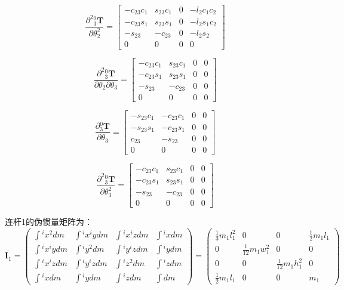 \documentclass{homework}
\begin{document}
\begin{sol}
\[
  \frac{\partial^2 {_3^0}\mathbf{T}}{\partial \theta_2^2} =
  \begin{bmatrix} 
    -c_{23} c_{1} & s_{23} c_{1} & 0 & - l_{2} c_{1} c_{2} \\ 
    -c_{23} s_{1} & s_{23} s_{1} & 0 & - l_{2} s_{1} c_{2} \\ 
    -s_{23} & -c_{23} & 0 & -l_{2} s_{2} \\ 
    0 & 0 & 0 & 0
  \end{bmatrix}
\]

\[
  \frac{\partial^2 {_3^0}\mathbf{T}}{\partial \theta_2 \partial \theta_3} =
  \begin{bmatrix} 
    -c_{23} c_{1} & s_{23} c_{1} & 0 & 0 \\ 
    -c_{23} s_{1} & s_{23} s_{1} & 0 & 0 \\ 
    -s_{23} & -c_{23} & 0 & 0 \\ 
    0 & 0 & 0 & 0
  \end{bmatrix}
\]

\[
  \frac{\partial {_3^0}\mathbf{T}}{\partial \theta_3} =
  \begin{bmatrix} 
    -s_{23} c_{1} & -c_{23} c_{1} & 0 & 0 \\ 
    -s_{23} s_{1} & -c_{23} s_{1} & 0 & 0 \\ 
    c_{23} & -s_{23} & 0 & 0 \\ 
    0 & 0 & 0 & 0
  \end{bmatrix}
\]

\[
  \frac{\partial^2 {_3^0}\mathbf{T}}{\partial \theta_3^2} =
  \begin{bmatrix} 
    -c_{23} c_{1} & s_{23} c_{1} & 0 & 0 \\ 
    -c_{23} s_{1} & s_{23} s_{1} & 0 & 0 \\ 
    -s_{23} & -c_{23} & 0 & 0 \\ 
    0 & 0 & 0 & 0
  \end{bmatrix}
\]

连杆1的伪惯量矩阵为：
\[
  \overline{\mathbf{I}_1} = 
  \begin{pmatrix}
    \int {^i}x^2 dm & \int {^i}x {^i}y dm & \int {^i}x {^i}z dm & \int {^i}x dm \\
    \int {^i}x {^i}y dm & \int {^i}y^2 dm & \int {^i}y {^i}z dm & \int {^i}y dm \\
    \int {^i}x {^i}z dm & \int {^i}y {^i}z dm & \int {^i}z^2 dm & \int {^i}z dm \\
    \int {^i}x dm & \int {^i}y dm & \int {^i}z dm & \int dm
  \end{pmatrix} =
  \begin{pmatrix}
    \frac{1}{3} m_1 l_1^2 & 0 & 0 & \frac{1}{2} m_1 l_1 \\
    0 & \frac{1}{12} m_1 w_1^2 & 0 & 0 \\
    0 & 0 & \frac{1}{12} m_1 h_1^2 & 0 \\
    \frac{1}{2} m_1 l_1 & 0 & 0 & m_1
  \end{pmatrix}
\]


\end{sol}
\end{document}
